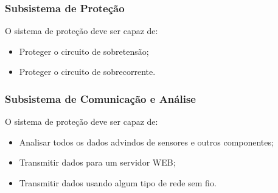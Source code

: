 \subsubsection{Subsistema de Proteção}
O sistema de proteção deve ser capaz de:
\begin{itemize}
	\item Proteger o circuito de sobretensão;
	\item Proteger o circuito de sobrecorrente.
\end{itemize}

\subsubsection{Subsistema de Comunicação e Análise}
O sistema de proteção deve ser capaz de:
\begin{itemize}
	\item Analisar todos os dados advindos de sensores e outros componentes;
	\item Transmitir dados para um servidor WEB;
	\item Transmitir dados usando algum tipo de rede sem fio.	
\end{itemize}